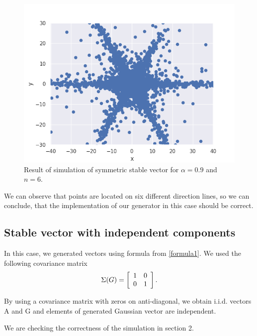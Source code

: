 \documentclass{article}
\begin{document}
	\begin{figure}[H]
		\centering
		\includegraphics[width=1\linewidth]{images/ex_1_a_alpha_stable_vector_simulation_symmetric_discreet_scatter.png}
		\caption{Result of simulation of symmetric stable vector for $\alpha=0.9$ and $n=6$.}\label{1}
	\end{figure}
	
	We can observe that points are located on six different direction lines, so we can conclude, that the implementation of our generator in this case should be correct.
	
	\subsection{Stable vector with independent components}
	
	In this case, we generated vectors using formula from \ref{formula1}. 
	We used the following covariance matrix 
	\begin{equation*}
		\Sigma(G) = \left[{\begin{array}{*{20}c}
			1 & 0\\
			0 & 1\end{array} } \right].
	\end{equation*}
	
	By using a covariance matrix with zeros on anti-diagonal, we obtain i.i.d. vectors A and G and elements of generated Gaussian vector are independent.
	
	We are checking the correctness of the simulation in section 2.
	
\end{document}
